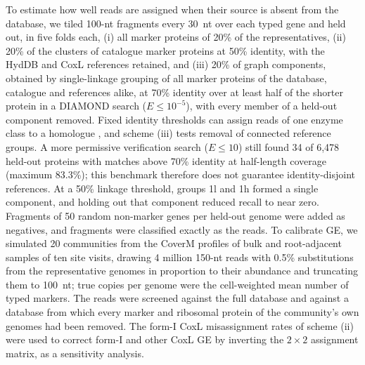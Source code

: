 To estimate how well reads are assigned when their source is absent from the database, we tiled 100-nt
fragments every 30~nt over each typed gene and held out, in five folds each, (i) all marker proteins of
20\% of the representatives, (ii) 20\% of the clusters of catalogue marker proteins at 50\% identity, with
the HydDB and CoxL references retained, and (iii) 20\% of graph components, obtained by
single-linkage grouping of all marker proteins of the database, catalogue and references alike, at 70\%
identity over at least half of the shorter protein in a DIAMOND search ($E\leq10^{-5}$), with every member of a held-out component removed.
Fixed identity thresholds can assign reads of one enzyme class to a homologue \citep{orellana2017rocker},
and scheme (iii) tests removal of connected reference groups. A more permissive verification search
($E\leq10$) still found 34 of 6,478 held-out proteins with matches above 70\% identity at half-length
coverage (maximum 83.3\%); this benchmark therefore does not guarantee identity-disjoint references.
At a 50\% linkage
threshold, groups 1l and 1h formed a single component, and holding out that component reduced recall to near zero. Fragments
of 50 random non-marker genes per held-out genome were added as negatives, and fragments were classified
exactly as the reads. To calibrate GE, we simulated 20 communities from the CoverM profiles of bulk and
root-adjacent samples of ten site visits, drawing 4 million 150-nt reads with 0.5\% substitutions from the
representative genomes in proportion to their abundance and truncating them to 100~nt; true copies per
genome were the cell-weighted mean number of typed markers. The reads were screened against the full
database and against a database from which every marker and ribosomal protein of the community's own
genomes had been removed. The form-I CoxL misassignment rates of scheme (ii) were used to correct form-I
and other CoxL GE by inverting the $2\times2$ assignment matrix, as a sensitivity analysis.

